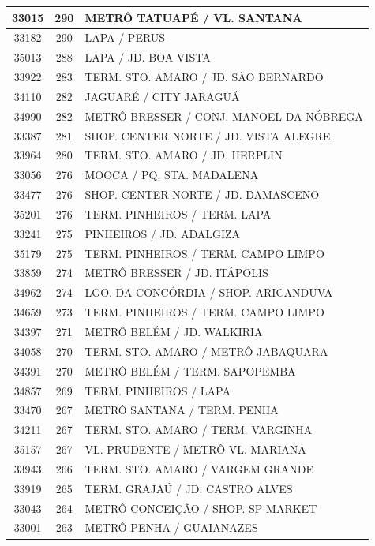 \documentclass[
	12pt,				%
	oneside,			%
	a4paper,			%
	english,			%
	brazil				%
	]{abntex2ppgsi}
\begin{document}
{{{\begin{apendicesenv}
\begin{longtable}{c|c|p{7cm}}
 \hline 
33015 &	290 &	METRÔ TATUAPÉ / VL. SANTANA \\ 
 \hline 
33182 &	290 &	LAPA / PERUS \\ 
 \hline 
35013 &	288 &	LAPA / JD. BOA VISTA \\ 
 \hline 
33922 &	283 &	TERM. STO. AMARO / JD. SÃO BERNARDO \\ 
 \hline 
34110 &	282 &	JAGUARÉ / CITY JARAGUÁ \\ 
 \hline 
34990 &	282 &	METRÔ BRESSER / CONJ. MANOEL DA NÓBREGA \\ 
 \hline 
33387 &	281 &	SHOP. CENTER NORTE / JD. VISTA ALEGRE \\ 
 \hline 
33964 &	280 &	TERM. STO. AMARO / JD. HERPLIN \\ 
 \hline 
33056 &	276 &	MOOCA / PQ. STA. MADALENA \\ 
 \hline 
33477 &	276 &	SHOP. CENTER NORTE / JD. DAMASCENO \\ 
 \hline 
35201 &	276 &	TERM. PINHEIROS / TERM. LAPA \\ 
 \hline 
33241 &	275 &	PINHEIROS / JD. ADALGIZA \\ 
 \hline 
35179 &	275 &	TERM. PINHEIROS / TERM. CAMPO LIMPO \\ 
 \hline 
33859 &	274 &	METRÔ BRESSER / JD. ITÁPOLIS \\ 
 \hline 
34962 &	274 &	LGO. DA CONCÓRDIA / SHOP. ARICANDUVA \\ 
 \hline 
34659 &	273 &	TERM. PINHEIROS / TERM. CAMPO LIMPO \\ 
 \hline 
34397 &	271 &	METRÔ BELÉM / JD. WALKIRIA \\ 
 \hline 
34058 &	270 &	TERM. STO. AMARO / METRÔ JABAQUARA \\ 
 \hline 
34391 &	270 &	METRÔ BELÉM / TERM. SAPOPEMBA \\ 
 \hline 
34857 &	269 &	TERM. PINHEIROS / LAPA \\ 
 \hline 
33470 &	267 &	METRÔ SANTANA / TERM. PENHA \\ 
 \hline 
34211 &	267 &	TERM. STO. AMARO / TERM. VARGINHA \\ 
 \hline 
35157 &	267 &	VL. PRUDENTE / METRÔ VL. MARIANA \\ 
 \hline 
33943 &	266 &	TERM. STO. AMARO / VARGEM GRANDE \\ 
 \hline 
33919 &	265 &	TERM. GRAJAÚ / JD. CASTRO ALVES \\ 
 \hline 
33043 &	264 &	METRÔ CONCEIÇÃO / SHOP. SP MARKET \\ 
 \hline 
33001 &	263 &	METRÔ PENHA / GUAIANAZES \\ 

\end{longtable}
\end{apendicesenv}}}}
\end{document}

